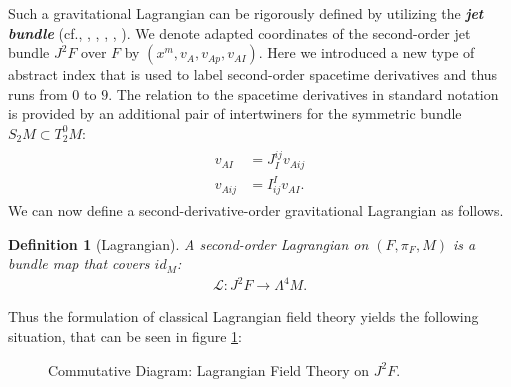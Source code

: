 \documentclass[%
preprint,
nofootinbib,
amsmath,amssymb,
aps,
prd,
floatfix,
]{revtex4-2}
\newtheorem{definition}{Definition}
\begin{document}
Such a gravitational Lagrangian can be rigorously defined by utilizing the \textit{\textbf{jet bundle}} (cf.\cite{saunders_1989}, \cite{seiler1994analysis}, \cite{seiler2009involution}, \cite{kolar1993natural}, \cite{Gotay1992StressEnergyMomentumTA}, \cite{1998physics...1019G}). 
We denote adapted coordinates of the second-order jet bundle $J^2F$ over $F$ by $(x^m, v_A, v_{Ap}, v_{AI})$. Here we introduced a new type of abstract index that is used to label second-order spacetime derivatives and thus runs from $0$ to $9$. 
The relation to the spacetime derivatives in standard notation is provided by an additional pair of intertwiners for the symmetric bundle $S_2M\subset T^0_2M$:
\begin{align}
    \begin{aligned}
        v_{AI} &= J_I^{ij} v_{Aij}\\
    v_{Aij} &= I^I_{ij} v_{AI}.
    \end{aligned}
\end{align}
We can now define a second-derivative-order gravitational Lagrangian as follows.
\begin{definition}[Lagrangian]
A second-order Lagrangian on $(F,\pi_F,M)$ is a bundle map that covers $id_M$:
\begin{align}
    \mathcal{L} : J^2F \longrightarrow \Lambda^4M.
\end{align}
\end{definition}
Thus the formulation of classical Lagrangian field theory yields the following situation, that can be seen in figure \ref{diagram1}:
\begin{figure}[hbt!]
\centering
{}
\caption{Commutative Diagram: Lagrangian Field Theory on $J^2F$.} \label{diagram1}
\end{figure}
\end{document}

